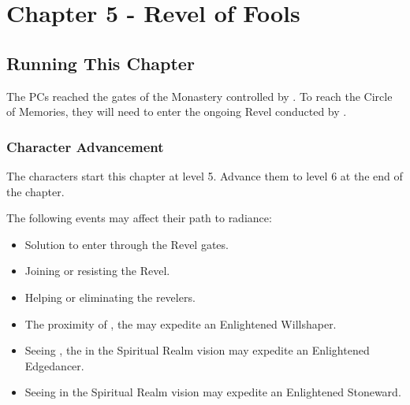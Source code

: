 \chapter{Chapter 5 - Revel of Fools}
\label{chap:chapter5}

\setcounter{section}{-1}
\section{Running This Chapter}

The PCs reached the gates of the Monastery controlled by \npcFractionCult{}. To reach the Circle of Memories, they will need to enter the ongoing Revel conducted by \npcHeartRevel{}.



\subsection{Character Advancement}

The characters start this chapter at level 5. Advance them to level 6 at the end of the chapter.

The following events may affect their path to radiance:
\begin{itemize}
	\item Solution to enter through the Revel gates.
	\item Joining or resisting the Revel.
	\item Helping or eliminating the revelers.
	\item The proximity of \npcHeartRevel{}, the \npcHeartRevelTitle{} may expedite an Enlightened Willshaper.
	\item Seeing \npcMidnightMother{}, the \npcMidnightMotherTitle{} in the Spiritual Realm vision may expedite an Enlightened Edgedancer.
	\item Seeing \npcMishram{} in the Spiritual Realm vision may expedite an Enlightened Stoneward.
\end{itemize}

